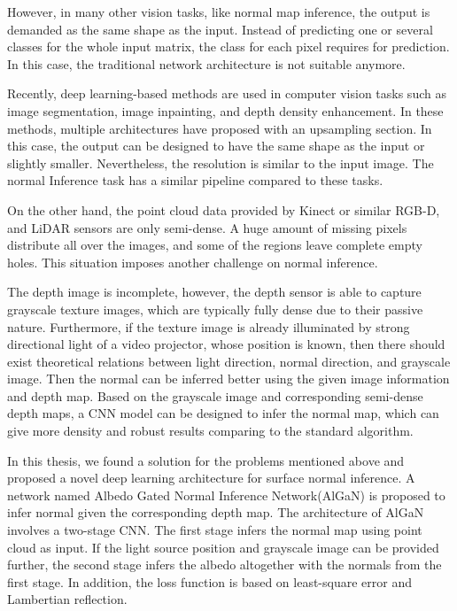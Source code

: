 However, in many other vision tasks, like normal map inference, the output is demanded as the same shape as the input. Instead of predicting one or several classes for the whole input matrix, the class for each pixel requires for prediction. In this case, the traditional network architecture is not suitable anymore.

Recently, deep learning-based methods are used in computer vision tasks such as image segmentation, image inpainting, and depth density enhancement. In these methods, multiple architectures have proposed with an upsampling section. In this case, the output can be designed to have the same shape as the input or slightly smaller. Nevertheless, the resolution is similar to the input image. The normal Inference task has a similar pipeline compared to these tasks.


On the other hand, the point cloud data provided by Kinect or similar RGB-D, and LiDAR sensors are only semi-dense. A huge amount of missing pixels distribute all over the images, and some of the regions leave complete empty holes. This situation imposes another challenge on normal inference. 

The depth image is incomplete, however, the depth sensor is able to capture grayscale texture images, which are typically fully dense due to their passive nature. Furthermore, if the texture image is already illuminated by strong directional light of a video projector, whose position is known, then there should exist theoretical relations between light direction, normal direction, and grayscale image. Then the normal can be inferred better using the given image information and depth map.  Based on the grayscale image and corresponding semi-dense depth maps, a CNN model can be designed to infer the normal map, which can give more density and robust results comparing to the standard algorithm. 



In this thesis, we found a solution for the problems mentioned above and proposed a novel deep learning architecture for surface normal inference. A network named Albedo Gated Normal Inference Network(AlGaN) is proposed to infer normal given the corresponding depth map. The architecture of AlGaN involves a two-stage CNN. The first stage infers the normal map using point cloud as input. If the light source position and grayscale image can be provided further, the second stage infers the albedo altogether with the normals from the first stage. In addition, the loss function is based on least-square error and Lambertian reflection.

